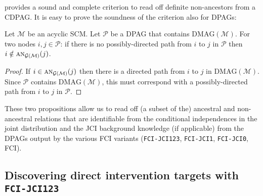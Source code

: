 \documentclass[twoside,11pt]{article}
\newcommand\C[1]{\mathcal{#1}}
\newcommand\mathbfsc[1]{\text{\normalfont\scshape#1}}
\newcommand\ansub[2]{\mathbfsc{an}_{#1}(#2)}
\newcommand{\DMAG}{\mathrm{DMAG}}
\newcommand{\alg}[1]{\texttt{#1}}
\begin{document}
\citet[p.\ 137]{Zhang2006} provides a sound and complete criterion to read off definite non-ancestors from a CDPAG. 
It is easy to prove the soundness of the criterion also for DPAGs:
\begin{proposition}\label{prop:dpag_nonancestors}
  Let $\C{M}$ be an acyclic SCM. 
  Let $\C{P}$ be a DPAG that contains $\DMAG(\C{M})$.
  For two nodes $i,j \in \C{P}$:
  if there is no possibly-directed path from $i$ to $j$ in $\C{P}$ then $i \notin \ansub{\C{G}(\C{M})}{j}$.
\end{proposition}
\begin{proof}
  If $i \in \ansub{\C{G}(\C{M})}{j}$ then there is a directed path from $i$ to $j$ in $\DMAG(\C{M})$. 
  Since $\C{P}$ contains $\DMAG(\C{M})$, this must correspond with a possibly-directed path from $i$ to $j$ in $\C{P}$.
\end{proof}

These two propositions allow us to read off (a subset of the) ancestral and non-ancestral relations that are identifiable
from the conditional independences in the joint distribution and the JCI background knowledge (if applicable) from the DPAGs 
output by the various FCI variants (\alg{FCI-JCI123}, \alg{FCI-JCI1}, \alg{FCI-JCI0}, FCI).

\subsection{Discovering direct intervention targets with \alg{FCI-JCI123}}\label{sec:app:fcijci123_intervention_targets}
\end{document}
